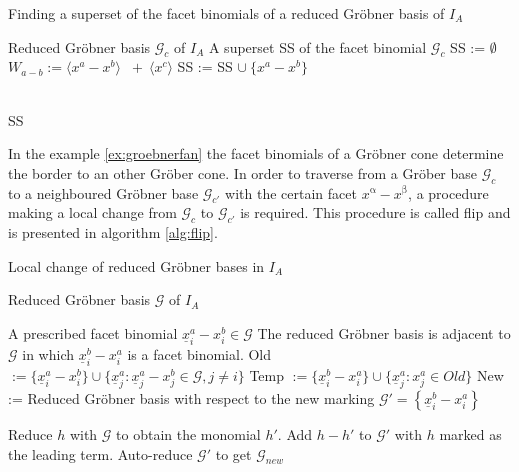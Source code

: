 \begin{algorithm}
\caption{Finding a superset of the facet binomials
of a reduced Gröbner basis of $I_A$ \cite{tigers}}
\label{alg:facetSS}
\begin{algorithmic}[1]

\Input
Reduced Gröbner basis $ \mathcal{G}_{c} $ of $I_A$
\Output A superset SS of the facet binomial $\mathcal{G}_{c}$
\State SS := $\emptyset$
\State $W_{a - b} := \langle x^{a}-x^{b}\rangle$
$~+~ \langle x^{c} \rangle$ 
\State SS := SS $\cup~ \{x^{a}-x^{b} \}$

\EndIf
\EndFor \\
\Return SS

\end{algorithmic}
\end{algorithm}
 

In the example \ref{ex:groebnerfan} the facet binomials of a Gröbner cone determine the border to an other Gröber cone.
In order to traverse from a Gröber base $\mathcal{G}_c$ to a neighboured Gröbner base $\mathcal{G}_{c'}$ with the certain facet $x^{\upalpha}-x^{\upbeta} $, a procedure making a local change from $\mathcal{G}_c$ to $\mathcal{G}_{c'}$ is required.
This procedure is called flip and is presented in algorithm \ref{alg:flip}. 
\newpage


\begin{algorithm}
\caption{Local change of reduced Gröbner bases in $I_A$ \cite{tigers}}
\label{alg:flip}
\begin{algorithmic}[1]

\Input
Reduced Gröbner basis $ \mathcal{G} $ of $I_A$

    A prescribed facet binomial $ \underline{x}^{a}_{i} - x^{b}_{i} \in \mathcal{G} $
\Output The reduced Gröbner basis is adjacent to $\mathcal{G}$ in which $ \underline{x}^{b}_{i} - x^{a}_{i} $ is a facet binomial.
\State Old 
$:= \lbrace \underline{x}^{a}_{i} - x^{b}_{i} \rbrace \cup
 \lbrace \underline{x}^{a}_{j} : \underline{x}^{a}_{j} - x^{b}_{j} \in \mathcal{G},
 j \neq i \rbrace $ 
 \State Temp $:= \lbrace \underline{x}^{b}_{i} - x^{a}_{i} \rbrace \cup 
 \lbrace \underline{x}^{a}_{j} : x^{a}_{j} \in Old  \rbrace $
 \State New := Reduced Gröbner basis with respect to the new marking 
 \State $\mathcal{G}' = \left\lbrace \underline{x}^{b}_{i} - x^{a}_{i} \right\rbrace  $
 
 \State Reduce $h$ with $\mathcal{G}$ to obtain the monomial $h'$.
 \State Add $h-h'$ to $\mathcal{G}'$ with $h$ marked as the leading term.
 \EndFor
 \State Auto-reduce $\mathcal{G}'$ to get $\mathcal{G}_{new}$

\end{algorithmic}
\end{algorithm}

